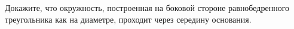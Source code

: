 \begin{ex}
	\begin{condition}
		Докажите, что окружность, построенная на боковой стороне равнобедренного треугольника как на диаметре, проходит через середину основания.
	\end{condition}
\end{ex}